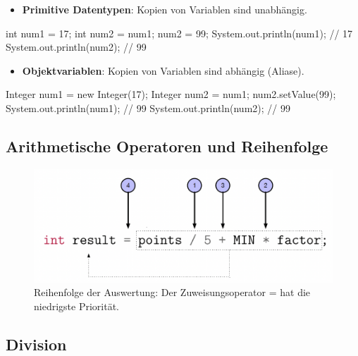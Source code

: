 \documentclass[a4paper,10pt, dvipsnames]{report}
\begin{document}
\begin{itemize}
    \item \textbf{Primitive Datentypen}: Kopien von Variablen sind unabhängig.
\end{itemize}

\begin{javacodebox}
    int num1 = 17;
    int num2 = num1;
    num2 = 99;
    System.out.println(num1); // 17
    System.out.println(num2); // 99
\end{javacodebox}


\begin{itemize}
    \item \textbf{Objektvariablen}: Kopien von Variablen sind abhängig (Aliase).
\end{itemize}

\begin{javacodebox}
    Integer num1 = new Integer(17);
    Integer num2 = num1;
    num2.setValue(99);
    System.out.println(num1); // 99
    System.out.println(num2); // 99
\end{javacodebox}

\subsection{Arithmetische Operatoren und Reihenfolge}


\begin{figure}
    \centering
    \includegraphics[width=0.5\linewidth]{resources/Operatorenreihenfolge.png}
    \caption{Reihenfolge der Auswertung: Der Zuweisungsoperator = hat die niedrigste Priorität.}
    \label{fig:Operatorenreihenfolge}
\end{figure}


\subsection{Division}
\end{document}
